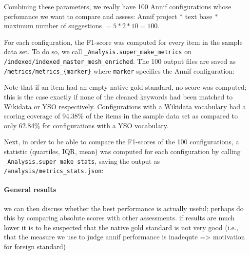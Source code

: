 Combining these parameters, we really have 100 Annif configurations
whose perfomance we want to compare and assess: Annif project \(*\) text
base \(*\) maximum number of suggestions \(= 5 * 2 * 10 = 100\).

For each configuration, the F1-score was computed for every item in the
sample data set. To do so, we call
\texttt{\_Analysis.super\_make\_metrics} on
\texttt{/indexed/indexed\_master\_mesh\_enriched}. The 100 output files
are saved as \texttt{/metrics/metrics\_\{marker\}} where \texttt{marker}
specifies the Annif configuration:

\begin{Shaded}
\begin{Highlighting}[]
\OperatorTok{+} \NormalTok{)}
\end{Highlighting}
\end{Shaded}

Note that if an item had an empty native gold standard, no score was
computed; this is the case exactly if none of the cleaned keywords had
been matched to Wikidata or YSO respectively. Configurations with a
Wikidata vocabulary had a scoring coverage of 94.38\% of the items in
the sample data set as compared to only 62.84\% for configurations with
a YSO vocabulary.

Next, in order to be able to compare the F1-scores of the 100
configurations, a statistic (quartiles, IQR, mean) was computed for each
configuration by calling \texttt{\_Analysis.super\_make\_stats}, saving
the output as \texttt{/analysis/metrics\_stats.json}:

\begin{Shaded}
\begin{Highlighting}[]
\end{Highlighting}
\end{Shaded}

\hypertarget{general-results}{%
\paragraph{General results}\label{general-results}}

we can then discuss whether the best performance is actually useful;
perhaps do this by comparing absolute scores with other assessments. if
results are much lower it is to be suspected that the native gold
standard is not very good (i.e., that the measure we use to judge annif
performance is inadequte =\textgreater{} motivation for foreign
standard)

